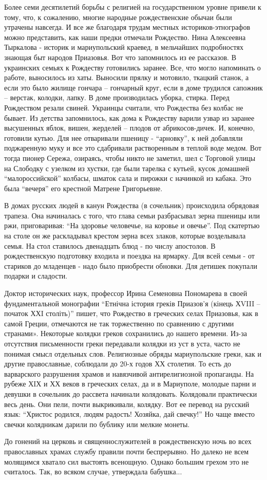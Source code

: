 Более семи десятилетий борьбы с религией на государственном уровне привели к
тому, что, к сожалению, многие народные рождественские обычаи были утрачены
навсегда. И все же благодаря трудам местных историков-этнографов можно
представить, как наши предки отмечали Рождество.  Нина Алексеевна Тыркалова -
историк и мариупольский краевед, в мельчайших подробностях знающая быт народов
Приазовья.  Вот что запомнилось из ее рассказов. В украинских семьях к
Рождеству  готовились заранее. Все, что могло напоминать о работе, выносилось
из хаты. Выносили прялку и мотовило, ткацкий станок, а если это было жилище
гончара – гончарный круг, если в доме трудился сапожник – верстак, колодки,
лапку. В доме производилась уборка, стирка. Перед Рождеством резали свиней.
Украинцы считали, что Рождества без колбас не бывает. Из детства запомнилось,
как дома к Рождеству варили узвар из заранее высушенных яблок, вишен, жерделей
– плодов от абрикосов-дичек. И, конечно, готовили кутью. Для нее отваривали
пшеницу - \enquote{арновку}, к ней добавляли поджаренную муку и все это сдабривали
растворенным в теплой воде медом.  Вот тогда пионер Сережа, озираясь, чтобы
никто не заметил, шел с Торговой улицы на Слободку с узелком из хустки, где
были тарелка с кутьей, кусок домашней \enquote{малороссийской} колбасы, шматок сала и
пирожки с начинкой из кабака. Это была \enquote{вечеря} его крестной Матрене
Григорьевне.


В домах русских людей в канун Рождества (в сочельник) происходила обрядовая
трапеза. Она начиналась с того, что глава семьи разбрасывал зерна пшеницы или
ржи, приговаривая: \enquote{На здоровье человечье, на коровье и овечье}. Под скатертью
на столе он же раскладывал  крестом зерна всех злаков, которые возделывала
семья. На стол ставилось двенадцать блюд - по числу апостолов. В рождественскую
подготовку входила и поездка на ярмарку. Для всей семьи - от стариков до
младенцев - надо было приобрести обновки. Для детишек покупали  подарки и
сладости. 

Доктор исторических наук, профессор Ирина Семеновна Пономарева  в своей
фундаментальной монографии \enquote{Етнічна істория греків Приазов'я (кінець ХVIII –
початок ХХI століть)} пишет, что  Рождество в греческих селах Приазовья, как в
самой Греции, отмечаются не так торжественно по сравнению с другими странами».
Некоторые колядки греков сохранились  до нашего времени. Из-за отсутствия
письменности греки передавали колядки из уст в уста, часто не понимая смысл
отдельных слов. Религиозные обряды мариупольские греки, как и другие
православные,  соблюдали до 20-х годов ХХ столетия. То есть до варварского
разрушения храмов и навязчивой антирелигиозной пропаганды. На рубеже ХIХ и ХХ
веков в греческих селах, да и в Мариуполе, молодые парни и девушки в сочельник
до рассвета начинали колядовать. Колядовали практически весь день. Они пели,
почти выкрикивали, колядку. Вот ее перевод на русский язык: \enquote{Христос родился,
людям радость! Хозяйка, дай свечку!} Но чаще вместо свечки колядникам дарили по
бублику или мелкие монеты.

До гонений на церковь и священнослужителей в рождественскую ночь во всех
православных храмах службу правили почти беспрерывно. Но далеко не всем
молящимся  хватало сил выстоять всенощную. Однако большим грехом это не
считалось. Так, во всяком случае, утверждала бабушка...
